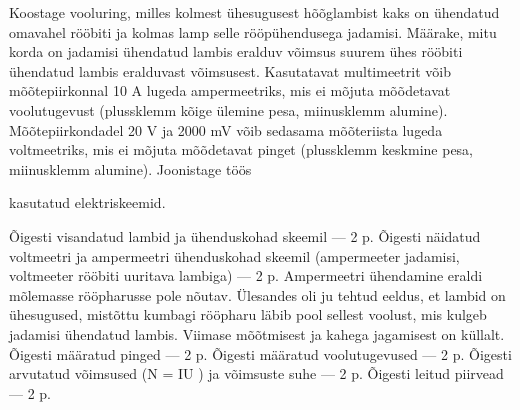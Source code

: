 
Koostage vooluring, milles kolmest ühesugusest hõõglambist kaks on ühendatud omavahel rööbiti ja kolmas lamp selle rööpühendusega jadamisi. Määrake, mitu korda on jadamisi ühendatud lambis eralduv võimsus suurem ühes rööbiti ühendatud lambis eralduvast võimsusest. Kasutatavat multimeetrit võib mõõtepiirkonnal 10 A lugeda ampermeetriks, mis ei mõjuta mõõdetavat voolutugevust (plussklemm kõige ülemine pesa, miinusklemm alumine). Mõõtepiirkondadel 20 V ja 2000 mV võib sedasama mõõteriista lugeda voltmeetriks, mis ei mõjuta mõõdetavat pinget (plussklemm keskmine pesa, miinusklemm alumine). Joonistage töös

kasutatud elektriskeemid.

\hint

\solu
Õigesti visandatud lambid ja ühenduskohad skeemil --- 2 p. Õigesti näidatud voltmeetri ja ampermeetri ühenduskohad skeemil (ampermeeter jadamisi, voltmeeter rööbiti uuritava lambiga) --- 2 p. Ampermeetri ühendamine eraldi mõlemasse rööpharusse pole nõutav. Ülesandes oli ju tehtud eeldus, et lambid on ühesugused, mistõttu kumbagi rööpharu läbib pool sellest voolust, mis kulgeb jadamisi ühendatud lambis. Viimase mõõtmisest ja kahega jagamisest on küllalt. Õigesti määratud pinged --- 2 p. Õigesti määratud voolutugevused --- 2 p. Õigesti arvutatud võimsused (N = IU ) ja võimsuste suhe --- 2 p. Õigesti leitud piirvead --- 2 p.
\probend
